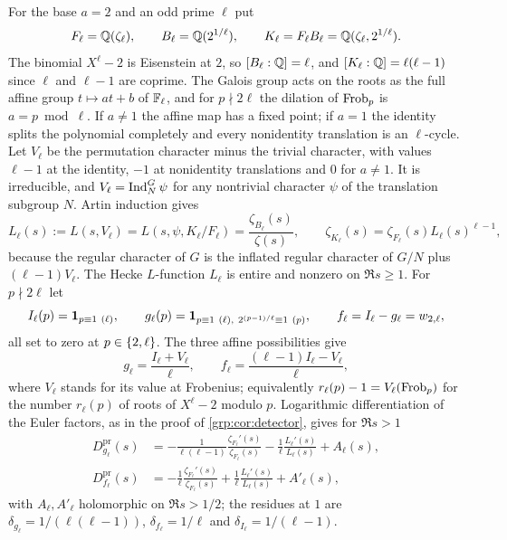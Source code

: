 For the base $a=2$ and an odd prime $\ell$ put
\[
 F_\ell=\mathbb{Q}(\zeta_\ell),\qquad B_\ell=\mathbb{Q}(2^{1/\ell}),\qquad
 K_\ell=F_\ell B_\ell=\mathbb{Q}(\zeta_\ell,2^{1/\ell}).
\]
The binomial $X^\ell-2$ is Eisenstein at $2$, so $[B_\ell:\mathbb{Q}]=\ell$, and
$[K_\ell:\mathbb{Q}]=\ell(\ell-1)$ since $\ell$ and $\ell-1$ are coprime. The Galois
group acts on the roots as the full affine group $t\mapsto at+b$ of
$\mathbb{F}_\ell$, and for $p\nmid2\ell$ the dilation of $\operatorname{Frob}_p$ is $a=p\bmod\ell$.
If $a\ne1$ the affine map has a fixed point; if $a=1$ the identity splits the
polynomial completely and every nonidentity translation is an $\ell$-cycle.
Let $V_\ell$ be the permutation character minus the trivial character, with
values $\ell-1$ at the identity, $-1$ at nonidentity translations and $0$ for
$a\ne1$. It is irreducible, and $V_\ell=\operatorname{Ind}_N^G\psi$ for any nontrivial
character $\psi$ of the translation subgroup $N$. Artin induction gives
\begin{equation}\label{grp:eq:kummer-fact}
 L_\ell(s):=L(s,V_\ell)=L(s,\psi,K_\ell/F_\ell)
 =\frac{\zeta_{B_\ell}(s)}{\zeta(s)},\qquad
 \zeta_{K_\ell}(s)=\zeta_{F_\ell}(s)L_\ell(s)^{\ell-1},
\end{equation}
because the regular character of $G$ is the inflated regular character of
$G/N$ plus $(\ell-1)V_\ell$. The Hecke $L$-function $L_\ell$ is entire and
nonzero on $\Re s\ge1$. For $p\nmid2\ell$ let
\[
 I_\ell(p)=\grpone_{p\equiv1\ (\ell)},\qquad
 g_\ell(p)=\grpone_{p\equiv1\ (\ell),\ 2^{(p-1)/\ell}\equiv1\ (p)},\qquad
 f_\ell=I_\ell-g_\ell=w_{2,\ell},
\]
all set to zero at $p\in\{2,\ell\}$. The three affine possibilities give
\begin{equation}\label{grp:eq:kummer-ind}
 g_\ell=\frac{I_\ell+V_\ell}{\ell},\qquad
 f_\ell=\frac{(\ell-1)I_\ell-V_\ell}{\ell},
\end{equation}
where $V_\ell$ stands for its value at Frobenius; equivalently
$r_\ell(p)-1=V_\ell(\operatorname{Frob}_p)$ for the number $r_\ell(p)$ of roots of
$X^\ell-2$ modulo $p$. Logarithmic differentiation of the Euler factors, as in
the proof of \cref{grp:cor:detector}, gives for $\Re s>1$
\begin{align}
 D^{\mathrm{pr}}_{g_\ell}(s)&=-\frac1{\ell(\ell-1)}\frac{\zeta_{F_\ell}'(s)}{\zeta_{F_\ell}(s)}
 -\frac1\ell\frac{L_\ell'(s)}{L_\ell(s)}+A_\ell(s),\label{grp:eq:kummer-pg}\\
 D^{\mathrm{pr}}_{f_\ell}(s)&=-\frac1\ell\frac{\zeta_{F_\ell}'(s)}{\zeta_{F_\ell}(s)}
 +\frac1\ell\frac{L_\ell'(s)}{L_\ell(s)}+A'_\ell(s),\label{grp:eq:kummer-pf}
\end{align}
with $A_\ell,A'_\ell$ holomorphic on $\Re s>1/2$; the residues at $1$ are
$\delta_{g_\ell}=1/(\ell(\ell-1))$, $\delta_{f_\ell}=1/\ell$ and
$\delta_{I_\ell}=1/(\ell-1)$.


